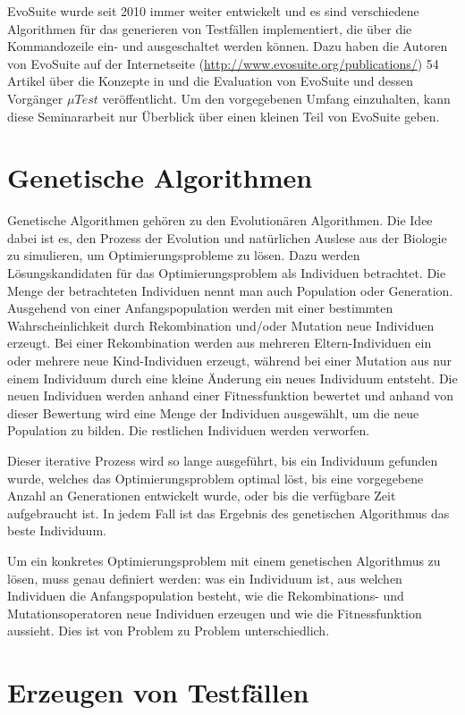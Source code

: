 \documentclass[a4paper,11pt]{article}
\begin{document}
EvoSuite wurde seit 2010 immer weiter entwickelt und es sind verschiedene Algorithmen für das generieren von Testfällen implementiert, die über die Kommandozeile ein- und ausgeschaltet werden können.
Dazu haben die Autoren von EvoSuite auf der Internetseite (\url{http://www.evosuite.org/publications/}) 54 Artikel über die Konzepte in und die Evaluation von EvoSuite und dessen Vorgänger ${\mu}Test$ veröffentlicht.
Um den vorgegebenen Umfang einzuhalten, kann diese Seminararbeit nur Überblick über einen kleinen Teil von EvoSuite geben.

\section{Genetische Algorithmen}
\label{sec:gen_alg}

Genetische Algorithmen gehören zu den Evolutionären Algorithmen.
Die Idee dabei ist es, den Prozess der Evolution und natürlichen Auslese aus der Biologie zu simulieren, um Optimierungsprobleme zu lösen.
Dazu werden Lösungskandidaten für das Optimierungsproblem als Individuen betrachtet.
Die Menge der betrachteten Individuen nennt man auch Population oder Generation.
Ausgehend von einer Anfangspopulation werden mit einer bestimmten Wahrscheinlichkeit durch Rekombination und/oder Mutation neue Individuen erzeugt.
Bei einer Rekombination werden aus mehreren Eltern-Individuen ein oder mehrere neue Kind-Individuen erzeugt, während bei einer Mutation aus nur einem Individuum durch eine kleine Änderung ein neues Individuum entsteht.
Die neuen Individuen werden anhand einer Fitnessfunktion bewertet und anhand von dieser Bewertung wird eine Menge der Individuen ausgewählt, um die neue Population zu bilden.
Die restlichen Individuen werden verworfen.

Dieser iterative Prozess wird so lange ausgeführt, bis ein Individuum gefunden wurde, welches das Optimierungsproblem optimal löst, bis eine vorgegebene Anzahl an Generationen entwickelt wurde, oder bis die verfügbare Zeit aufgebraucht ist.
In jedem Fall ist das Ergebnis des genetischen Algorithmus das beste Individuum.

Um ein konkretes Optimierungsproblem mit einem genetischen Algorithmus zu lösen, muss genau definiert werden: was ein Individuum ist, aus welchen Individuen die Anfangspopulation besteht, wie die Rekombinations- und Mutationsoperatoren neue Individuen erzeugen und wie die Fitnessfunktion aussieht.
Dies ist von Problem zu Problem unterschiedlich.

\section{Erzeugen von Testfällen}
\end{document}

